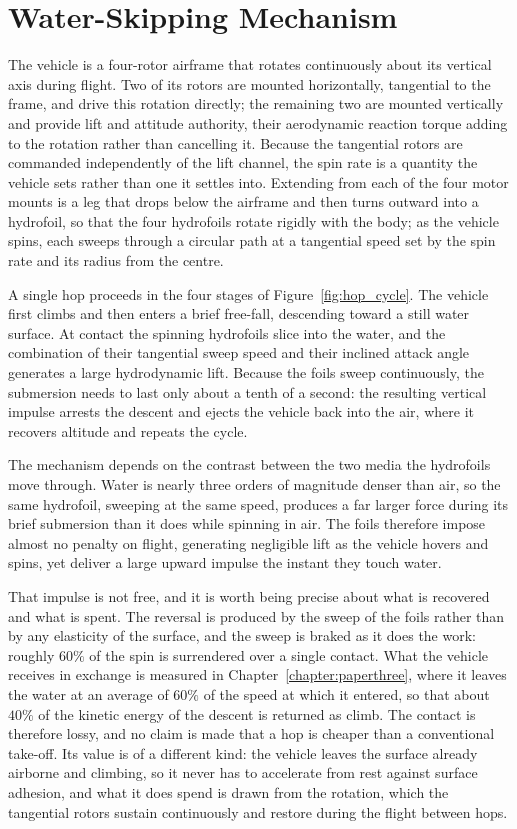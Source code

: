 \section{Water-Skipping Mechanism}
\label{sec:water_skipping_mechanism}

The vehicle is a four-rotor airframe that rotates continuously about its
vertical axis during flight.  Two of its rotors are mounted horizontally,
tangential to the frame, and drive this rotation directly; the remaining two
are mounted vertically and provide lift and attitude authority, their
aerodynamic reaction torque adding to the rotation rather than cancelling it.
Because the tangential rotors are commanded independently of the lift channel,
the spin rate is a quantity the vehicle sets rather than one it settles into.
Extending from each of the four motor mounts is a leg that drops below the
airframe and then turns outward into a hydrofoil, so that the four hydrofoils
rotate rigidly with the body; as the vehicle spins, each sweeps through a
circular path at a tangential speed set by the spin rate and its radius from
the centre.

A single hop proceeds in the four stages of
Figure~\ref{fig:hop_cycle}.  The vehicle first climbs and then enters a brief
free-fall, descending toward a still water surface.  At contact
the spinning hydrofoils slice into the water, and the combination of their
tangential sweep speed and their inclined attack angle generates a large
hydrodynamic lift.  Because the foils sweep continuously, the submersion needs
to last only about a tenth of a second: the resulting vertical impulse arrests
the descent and ejects the vehicle back into the air, where it recovers
altitude and repeats the cycle.

The mechanism depends on the contrast between the two media the hydrofoils move
through.  Water is nearly three orders of magnitude denser than air, so the
same hydrofoil, sweeping at the same speed, produces a far larger force during
its brief submersion than it does while spinning in air.  The foils therefore
impose almost no penalty on flight, generating negligible lift as the vehicle
hovers and spins, yet deliver a large upward impulse the instant they touch
water.

That impulse is not free, and it is worth being precise about what is recovered
and what is spent.  The reversal is produced by the sweep of the foils rather
than by any elasticity of the surface, and the sweep is braked as it does the
work: roughly $60\%$ of the spin is surrendered over a single contact.  What
the vehicle receives in exchange is measured in
Chapter~\ref{chapter:paperthree}, where it leaves the water at an average of
$60\%$ of the speed at which it entered, so that about $40\%$ of the kinetic
energy of the descent is returned as climb.  The contact is therefore lossy,
and no claim is made that a hop is cheaper than a conventional take-off.  Its
value is of a different kind: the vehicle leaves the surface already airborne
and climbing, so it never has to accelerate from rest against surface adhesion,
and what it does spend is drawn from the rotation, which the tangential rotors
sustain continuously and restore during the flight between hops.

